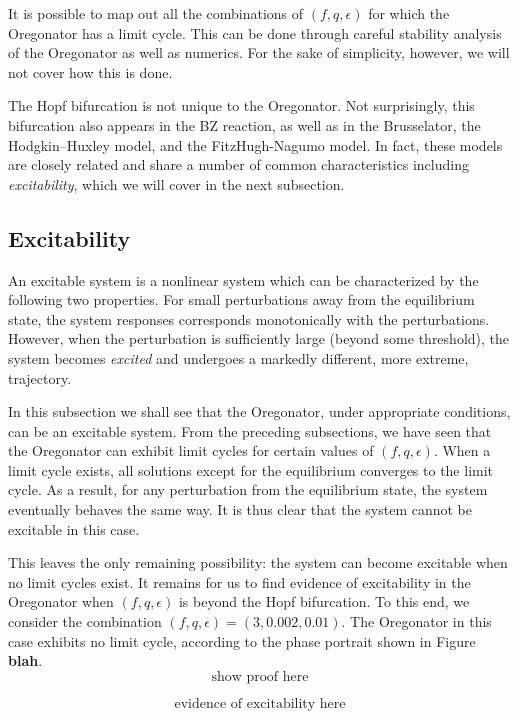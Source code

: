 \documentclass[twocolumn,amsmath,amssymb,aps]{revtex4}
\begin{document}
It is possible to map out all the combinations of $(f,q,\epsilon)$ for which the Oregonator has a limit cycle. This can be done through careful stability analysis of the Oregonator as well as numerics. For the sake of simplicity, however, we will not cover how this is done.


The Hopf bifurcation is not unique to the Oregonator. Not surprisingly, this bifurcation also appears in the BZ reaction, as well as in the Brusselator, the Hodgkin–Huxley model, and the FitzHugh-Nagumo model. In fact, these models are closely related and share a number of common characteristics including \textit{excitability}, which we will cover in the next subsection.\\


\subsection{Excitability}
An excitable system is a nonlinear system which can be characterized by the following two properties. For small perturbations away from the equilibrium state, the system responses corresponds monotonically with the perturbations.  However, when the perturbation is sufficiently large (beyond some threshold), the system becomes \textit{excited} and undergoes a markedly different, more extreme, trajectory.  

In this subsection we shall see that the Oregonator, under appropriate conditions, can be an excitable system. From the preceding subsections, we have seen that the Oregonator can exhibit limit cycles for certain values of $(f,q,\epsilon)$. When a limit cycle exists, all solutions except for the equilibrium converges to the limit cycle. As a result, for any perturbation from the equilibrium state, the system eventually behaves the same way. It is thus clear that the system cannot be excitable in this case. 

This leaves the only remaining possibility: the system  can become excitable when no limit cycles exist. It remains for us to find evidence of excitability in the Oregonator when $(f,q,\epsilon)$ is beyond the Hopf bifurcation. To this end, we consider the combination $(f,q,\epsilon) = (3,0.002, 0.01)$. The Oregonator in this case exhibits no limit cycle, according to the phase portrait shown in Figure \textbf{blah}.
\begin{equation}
\text{show proof here}
\end{equation}

\begin{equation}
\text{evidence of excitability here}
\end{equation}
\end{document}
